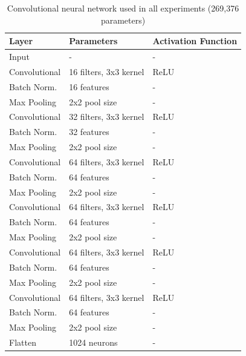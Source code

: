 \documentclass{article}
\begin{document}
\begin{table}[h]
  \centering
  \begin{tabular}{l|l|l}
    \textbf{Layer} & \textbf{Parameters} & \textbf{Activation Function} \\ \hline
    Input & - & - \\
    Convolutional & 16 filters, 3x3 kernel & ReLU \\
    Batch Norm. & 16 features & - \\
    Max Pooling & 2x2 pool size & - \\
    Convolutional & 32 filters, 3x3 kernel & ReLU \\
    Batch Norm. & 32 features & - \\
    Max Pooling & 2x2 pool size & - \\
    Convolutional & 64 filters, 3x3 kernel & ReLU \\
    Batch Norm. & 64 features & - \\
    Max Pooling & 2x2 pool size & - \\
    Convolutional & 64 filters, 3x3 kernel & ReLU \\
    Batch Norm. & 64 features & - \\
    Max Pooling & 2x2 pool size & - \\
    Convolutional & 64 filters, 3x3 kernel & ReLU \\
    Batch Norm. & 64 features & - \\
    Max Pooling & 2x2 pool size & - \\
    Convolutional & 64 filters, 3x3 kernel & ReLU \\
    Batch Norm. & 64 features & - \\
    Max Pooling & 2x2 pool size & - \\
    Flatten & 1024 neurons & - \\
  \end{tabular}
  \caption{Convolutional neural network used in all experiments (269,376 parameters)}
  \label{tab:CNN}
\end{table}



\end{document}
